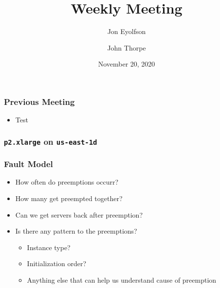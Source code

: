 
\title{Weekly Meeting}
\date{November 20, 2020}
\author{Jon Eyolfson \and John Thorpe}



  \begin{frame}[plain]
    \titlepage
  \end{frame}

  \setcounter{framenumber}{0}

  \begin{frame}
    \frametitle{Previous Meeting}

    \begin{itemize}
      \item Test
    \end{itemize}
  \end{frame}

  \begin{frame}
    \frametitle{\texttt{p2.xlarge} on \texttt{us-east-1d}}

    
  \end{frame}

  \begin{frame}
    \frametitle{Fault Model}
      \begin{itemize}
        \item How often do preemptions occurr?
        \item How many get preempted together?
        \item Can we get servers back after preemption?
        \item Is there any pattern to the preemptions?
        \begin{itemize}
          \item Instance type?
          \item Initialization order?
          \item Anything else that can help us understand cause of preemption
        \end{itemize}

      \end{itemize}
  \end{frame}


